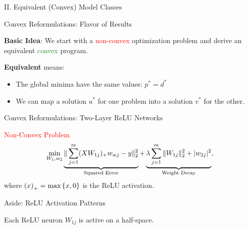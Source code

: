 \documentclass[usenames,dvipsnames,mathserif,notheorems]{beamer}
\newcommand{\red}[1]{\textcolor{Red}{#1}}
\newcommand{\green}[1]{\textcolor{ForestGreen}{#1}}
\begin{document}

\begin{frame}{}
	\begin{center}
		\huge II. Equivalent (Convex) Model Classes
	\end{center}
\end{frame}

\begin{frame}{Convex Reformulations: Flavor of Results}

	{ \large
		\textbf{Basic Idea}: We start with a \red{non-convex} optimization problem and derive
		an equivalent \green{convex} program.
	}

	\pause
	\vspace{2em}

	\textbf{Equivalent} means:
	\vspace{0.5em}
	\begin{itemize}
		\item The global minima have the same values: \( p^* = d^* \)
		      \vspace{0.5em}
		\item We can map a solution \( u^* \) for one problem into a solution
		      \( v^* \) for the other.
		      \vspace{0.5em}
	\end{itemize}

\end{frame}


\begin{frame}{Convex Reformulations: Two-Layer ReLU Networks}

	{\large \textcolor{Red}{Non-Convex Problem}}
	\[
		\min_{W_1, w_2} \underbrace{\|\sum_{j=1}^m (X W_{1j})_+ w_{wj} - y\|_2^2}_{\text{Squared Error}}
		+ \underbrace{\lambda \sum_{j=1}^m \|W_{1j}\|_2^2 + |w_{2j}|^2}_{\text{Weight Decay}},
	\]
	where \( \left(x\right)_+ = \max\left\{x, 0\right\} \) is the ReLU activation.
	\pause

	\begin{figure}[]
		\centering
		
	\end{figure}

\end{frame}

\begin{frame}{Aside: ReLU Activation Patterns}

	Each ReLU neuron $W_{1j}$ is active on a half-space.

	\pause
	\begin{figure}[]
		\centering
		
	\end{figure}

\end{frame}
\end{document}
